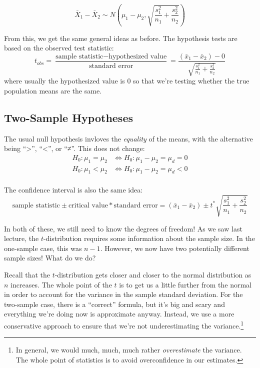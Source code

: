 \documentclass[
  letterpaper,
  DIV=11,
  numbers=noendperiod,
  oneside]{scrreprt}
\begin{document}
\[
\bar X_1 - \bar X_2 \sim N\left(\mu_1 - \mu_2, \sqrt{\frac{s_1^2}{n_1} + \frac{s_2^2}{n_2}}\right)
\]

From this, we get the same general ideas as before. The hypothesis tests
are based on the observed test statistic: \[
t_{obs} = \frac{\text{sample statistic} - \text{hypothesized value}}{\text{standard error}} = \frac{(\bar x_1 - \bar x_2) - 0}{\sqrt{\frac{s_1^2}{n_1} + \frac{s_2^2}{n_2}}}
\] where usually the hypothesized value is 0 so that we're testing
whether the true population means are the same.

\hypertarget{two-sample-hypotheses}{%
\subsection{Two-Sample Hypotheses}\label{two-sample-hypotheses}}

The usual null hypothesis invloves the \emph{equality} of the means,
with the alternative being ``\textgreater{}'', ``\textless{}'', or
``≠''. This does not change: \begin{align*}
H_0: \mu_1 = \mu_2 &\Leftrightarrow H_0:\mu_1 - \mu_2 = \mu_d = 0\\
H_0: \mu_1 < \mu_2 &\Leftrightarrow H_0:\mu_1 - \mu_2 = \mu_d < 0\\
\end{align*}

The confidence interval is also the same idea: \[
\text{sample statistic}\pm\text{critical value}*\text{standard error} = (\bar x_1 - \bar x_2)\pm t^*\sqrt{\frac{s_1^2}{n_1} + \frac{s_2^2}{n_2}}
\]

In both of these, we still need to know the degrees of freedom! As we
saw last lecture, the \(t\)-distribution requires some information about
the sample size. In the one-sample case, this was \(n-1\). However, we
now have two potentially different sample sizes! What do we do?

Recall that the \(t\)-distribution gets closer and closer to the normal
distribution as \(n\) increases. The whole point of the \(t\) is to get
us a little further from the normal in order to account for the variance
in the sample standard deviation. For the two-sample case, there is a
``correct'' formula, but it's big and scary and everything we're doing
now is approximate anyway. Instead, we use a more conservative approach
to ensure that we're not underestimating the variance.\footnote{In
  general, we would much, much, much rather \emph{overestimate} the
  variance. The whole point of statistics is to avoid overconfidence in
  our estimates.}
\end{document}
